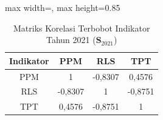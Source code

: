 \begin{table}[H]
\centering
\caption{Matriks Korelasi Terbobot Indikator Tahun 2021 ($\mathbf{S}_{2021}$)} \label{tab:sample2matriks_intra_loading_2021}
\begin{adjustbox}{max width=\textwidth, max height=0.85\textheight}
\begin{tabular}{|c|c|c|c|}
\hline
\textbf{Indikator} & \textbf{PPM} & \textbf{RLS} & \textbf{TPT} \\
\hline
PPM & 1 & -0,8307 & 0,4576 \\
RLS & -0,8307 & 1 & -0,8751 \\
TPT & 0,4576 & -0,8751 & 1 \\
\hline
\end{tabular}
\end{adjustbox}
\end{table}